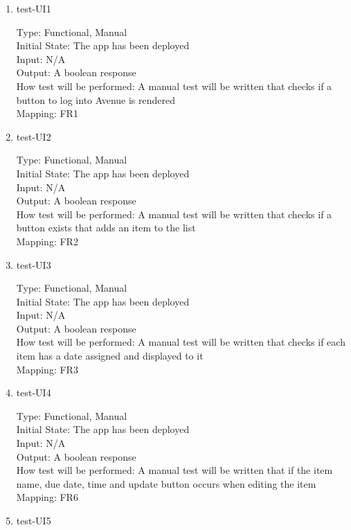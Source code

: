 \documentclass[12pt, titlepage]{article}
\begin{document}
\begin{enumerate}
\item{test-UI1\\}

Type: Functional, Manual\\
Initial State: The app has been deployed\\
Input: N/A\\
Output: A boolean response\\
How test will be performed: A manual test will be written that checks if a button to log into Avenue is rendered\\
Mapping: FR1

\item{test-UI2\\}

Type: Functional, Manual\\
Initial State: The app has been deployed\\
Input: N/A\\
Output: A boolean response\\
How test will be performed: A manual test will be written that checks if a button exists that adds an item to the list\\
Mapping: FR2

\item{test-UI3\\}

Type: Functional, Manual\\
Initial State: The app has been deployed\\
Input: N/A\\
Output: A boolean response\\
How test will be performed: A manual test will be written that checks if each item has a date assigned and displayed to it\\
Mapping: FR3

\item{test-UI4\\}

Type: Functional, Manual\\
Initial State: The app has been deployed\\
Input: N/A\\
Output: A boolean response\\
How test will be performed: A manual test will be written that if the item name, due date, time and update button occurs when editing the item\\
Mapping: FR6

\item{test-UI5\\}


\end{enumerate}
\end{document}
